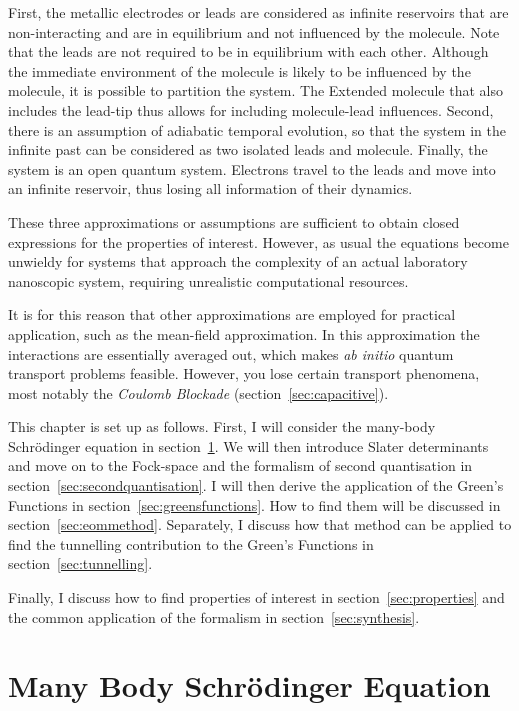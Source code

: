 First, the metallic electrodes or leads are considered as infinite reservoirs that are non\hyp{}interacting and are in equilibrium and not influenced by the molecule. Note that the leads are not required to be in equilibrium with each other. Although the immediate environment of the molecule is likely to be influenced by the molecule, it is possible to partition the system. The Extended molecule that also includes the lead-tip thus allows for including  molecule-lead influences. Second, there is an assumption of adiabatic temporal evolution, so that the system in the infinite past can be considered as two isolated leads and molecule.  Finally, the system is an open quantum system. Electrons travel to the leads and move into an infinite reservoir, thus losing all information of their dynamics. 

These three approximations or assumptions are sufficient to obtain closed expressions for the properties of interest. However, as usual the equations become unwieldy for systems that approach the complexity of an actual laboratory nanoscopic system, requiring unrealistic computational resources.

It is for this reason that other approximations are employed for practical application, such as the mean-field approximation. In this approximation the interactions are essentially averaged out, which makes \emph{ab initio} quantum transport problems feasible. However, you lose certain transport phenomena, most notably the \emph{Coulomb Blockade} (section~\ref{sec:capacitive}).

This chapter is set up as follows. First, I will consider the many-body Schr\"odinger equation in section~\ref{sec:schrodinger}. We will then introduce Slater determinants and move on to the Fock-space and the formalism of second quantisation in section~\ref{sec:secondquantisation}. I will then derive the application of the Green's Functions in section~\ref{sec:greensfunctions}. How to find them will be discussed in section~\ref{sec:eommethod}. Separately, I discuss how that method can be applied to find the tunnelling contribution to the Green's Functions in section~\ref{sec:tunnelling}.

Finally, I discuss how to find properties of interest in section~\ref{sec:properties} and the common application of the formalism in section~\ref{sec:synthesis}.

\section{Many Body Schr\"odinger Equation}
\label{sec:schrodinger}

